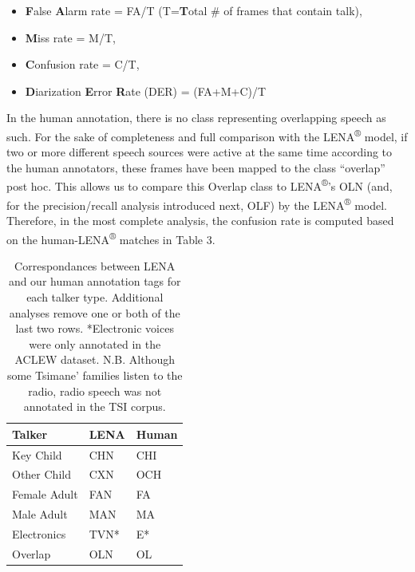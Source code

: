 \documentclass[english,floatsintext,man]{apa6}
\providecommand{\tightlist}{%
  \setlength{\itemsep}{0pt}\setlength{\parskip}{0pt}}
\begin{document}
\begin{itemize}
\tightlist
\item
  \textbf{F}alse \textbf{A}larm rate = FA/T (T=\textbf{T}otal \# of
  frames that contain talk),
\item
  \textbf{M}iss rate = M/T,
\item
  \textbf{C}onfusion rate = C/T,
\item
  \textbf{D}iarization \textbf{E}rror \textbf{R}ate (DER) = (FA+M+C)/T
\end{itemize}

In the human annotation, there is no class representing overlapping
speech as such. For the sake of completeness and full comparison with
the LENA\textsuperscript{®} model, if two or more different speech
sources were active at the same time according to the human annotators,
these frames have been mapped to the class \enquote{overlap} post hoc.
This allows us to compare this Overlap class to
LENA\textsuperscript{®}'s OLN (and, for the precision/recall analysis
introduced next, OLF) by the LENA\textsuperscript{®} model. Therefore,
in the most complete analysis, the confusion rate is computed based on
the human-LENA\textsuperscript{®} matches in Table 3.

\begin{table}[t]

\caption{\label{tab:tab-tsicor}Correspondances between LENA and our human annotation tags for each talker type. Additional analyses remove one or both of the last two rows. *Electronic voices were only annotated in the ACLEW dataset. N.B. Although some Tsimane' families listen to the radio, radio speech was not annotated in the TSI corpus.}
\centering
\begin{tabular}{>{\raggedright\arraybackslash}p{4cm}>{\raggedright\arraybackslash}p{2cm}>{\raggedright\arraybackslash}p{2cm}}
\toprule
Talker & LENA & Human\\
\midrule
Key Child & CHN & CHI\\
Other Child & CXN & OCH\\
Female Adult & FAN & FA\\
Male Adult & MAN & MA\\
Electronics & TVN* & E*\\
\addlinespace
Overlap & OLN & OL\\
\bottomrule
\end{tabular}
\end{table}
\end{document}
